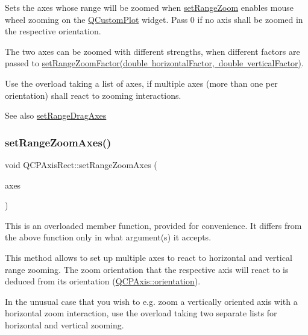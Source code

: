Sets the axes whose range will be zoomed when \mbox{\hyperlink{class_q_c_p_axis_rect_a7960a9d222f1c31d558b064b60f86a31}{set\+Range\+Zoom}} enables mouse wheel zooming on the \mbox{\hyperlink{class_q_custom_plot}{Q\+Custom\+Plot}} widget. Pass 0 if no axis shall be zoomed in the respective orientation.

The two axes can be zoomed with different strengths, when different factors are passed to \mbox{\hyperlink{class_q_c_p_axis_rect_a895d7ac745ea614e04056244b3c138ac}{set\+Range\+Zoom\+Factor(double horizontal\+Factor, double vertical\+Factor)}}.

Use the overload taking a list of axes, if multiple axes (more than one per orientation) shall react to zooming interactions.

\begin{DoxySeeAlso}{See also}
\mbox{\hyperlink{class_q_c_p_axis_rect_a648cce336bd99daac4a5ca3e5743775d}{set\+Range\+Drag\+Axes}} 
\end{DoxySeeAlso}
\mbox{\label{class_q_c_p_axis_rect_a07a41be4eda0d42abe49475e9fa38b92}} 
\subsubsection{\texorpdfstring{set\+Range\+Zoom\+Axes()}{setRangeZoomAxes()}\hspace{0.1cm}{\footnotesize\ttfamily [2/3]}}
{\footnotesize\ttfamily void Q\+C\+P\+Axis\+Rect\+::set\+Range\+Zoom\+Axes (\begin{DoxyParamCaption}\item[{Q\+List$<$ \mbox{\hyperlink{class_q_c_p_axis}{Q\+C\+P\+Axis}} $\ast$$>$}]{axes }\end{DoxyParamCaption})}

This is an overloaded member function, provided for convenience. It differs from the above function only in what argument(s) it accepts.

This method allows to set up multiple axes to react to horizontal and vertical range zooming. The zoom orientation that the respective axis will react to is deduced from its orientation (\mbox{\hyperlink{class_q_c_p_axis_ab988ef4538e2655bb77bd138189cd42e}{Q\+C\+P\+Axis\+::orientation}}).

In the unusual case that you wish to e.\+g. zoom a vertically oriented axis with a horizontal zoom interaction, use the overload taking two separate lists for horizontal and vertical zooming. \mbox{\label{class_q_c_p_axis_rect_ae85a63a856e111def77437812c3acc99}} 
